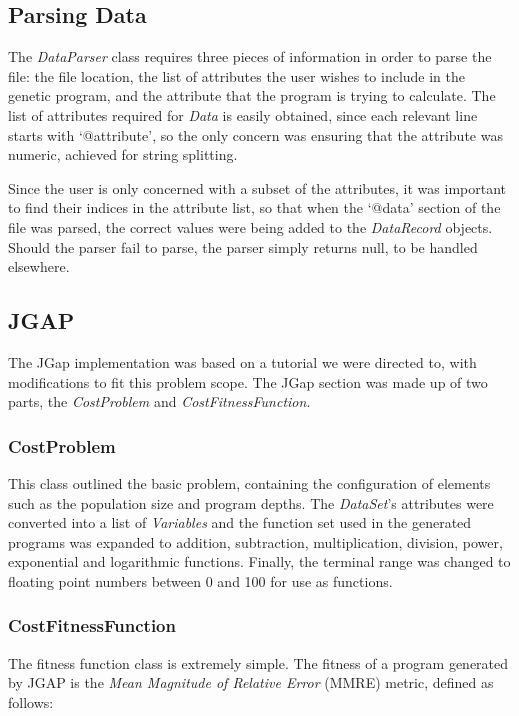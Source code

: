 \documentclass[11pt, a4paper]{article}
\begin{document}
\subsection{Parsing Data} %
\label{sub:parsing_data}
The \emph{DataParser} class requires three pieces of information in order to
parse the file: the file location, the list of attributes the user wishes to
include in the genetic program, and the attribute that the program is trying to
calculate. The list of attributes required for \emph{Data} is easily obtained,
since each relevant line starts with `@attribute', so the only concern was
ensuring that the attribute was numeric, achieved for string splitting.

Since the user is only concerned with a subset of the attributes, it was
important to find their indices in the attribute list, so that when the `@data'
section of the file was parsed, the correct values were being added to the
\emph{DataRecord} objects. Should the parser fail to parse, the parser simply
returns null, to be handled elsewhere.

\subsection{JGAP} %
\label{sub:jgap}
The JGap implementation was based on a tutorial \cite{JGapTutorial} we were
directed to, with modifications to fit this problem scope. The JGap section was
made up of two parts, the \emph{CostProblem} and \emph{CostFitnessFunction}.

\subsubsection{CostProblem} %
\label{ssub:costproblem}
This class outlined the basic problem, containing the configuration of elements
such as the population size and program depths. The \emph{DataSet}'s attributes
were converted into a list of \emph{Variables} and the function set used in the
generated programs was expanded to addition, subtraction, multiplication,
division, power, exponential and logarithmic functions. Finally, the terminal
range was changed to floating point numbers between 0 and 100 for use as
functions.

\subsubsection{CostFitnessFunction} %
\label{ssub:costfitnessfunction}
The fitness function class is extremely simple. The fitness of a program
generated by JGAP is the \emph{Mean Magnitude of Relative Error} (MMRE) metric,
defined as follows:
\end{document}
